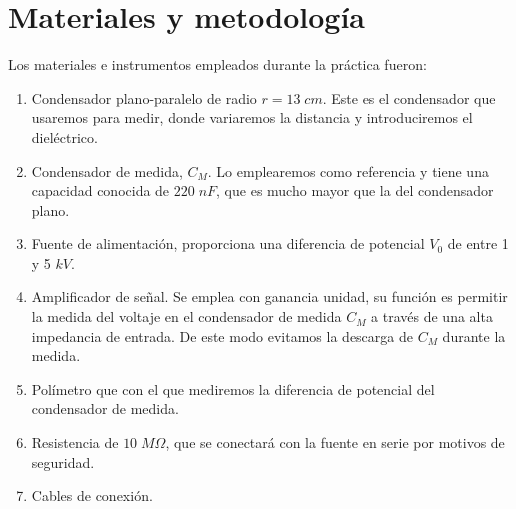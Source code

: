 \documentclass[a4paper,12pt,titlepage]{article}
\begin{document}
\section{Materiales y metodología}

Los materiales e instrumentos empleados durante la práctica fueron:

\begin{enumerate}
    \item Condensador plano-paralelo de radio $r=13 \;cm$. Este es el condensador que usaremos para medir, donde variaremos la distancia y introduciremos el dieléctrico.
    \item Condensador de medida, $C_M$. Lo emplearemos como referencia y tiene una capacidad conocida de $220 \;nF$, que es mucho mayor que la del condensador plano.
    \item Fuente de alimentación, proporciona una diferencia de potencial $V_0$ de entre 1 y 5 $kV$.
    \item Amplificador de señal. Se emplea con ganancia unidad, su función es permitir la medida del voltaje en el condensador de medida $C_M$ a través de una alta impedancia de entrada. De este modo evitamos la descarga de $C_M$ durante la medida.
    \item Polímetro que con el que mediremos la diferencia de potencial del condensador de medida.
    \item Resistencia de $10\; M\Omega$, que se conectará con la fuente en serie por motivos de seguridad.
    \item Cables de conexión.
\end{enumerate}
\end{document}
